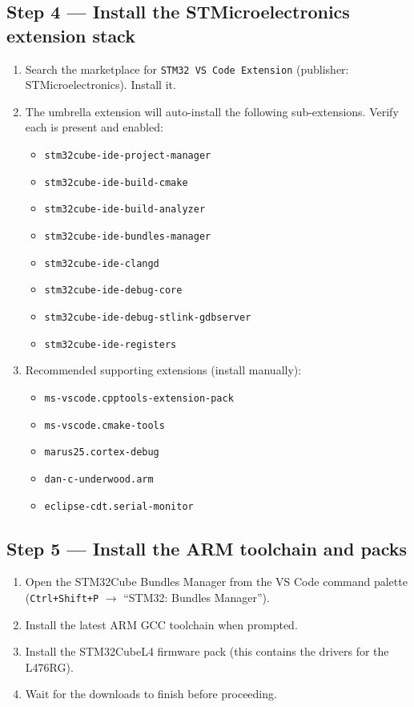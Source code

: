 \documentclass[11pt,letterpaper]{article}
\begin{document}
\newpage
\subsection{Step 4 --- Install the STMicroelectronics extension stack}
\begin{enumerate}[leftmargin=2em]
	\item Search the marketplace for \texttt{STM32 VS Code Extension} (publisher: STMicroelectronics). Install it.
	\item The umbrella extension will auto-install the following sub-extensions. Verify each is present and enabled:
	\begin{itemize}[leftmargin=1.2em, topsep=2pt, itemsep=1pt]
		\item \texttt{stm32cube-ide-project-manager}
		\item \texttt{stm32cube-ide-build-cmake}
		\item \texttt{stm32cube-ide-build-analyzer}
		\item \texttt{stm32cube-ide-bundles-manager}
		\item \texttt{stm32cube-ide-clangd}
		\item \texttt{stm32cube-ide-debug-core}
		\item \texttt{stm32cube-ide-debug-stlink-gdbserver}
		\item \texttt{stm32cube-ide-registers}
	\end{itemize}
	\item Recommended supporting extensions (install manually):
	\begin{itemize}[leftmargin=1.2em, topsep=2pt, itemsep=1pt]
		\item \texttt{ms-vscode.cpptools-extension-pack}
		\item \texttt{ms-vscode.cmake-tools}
		\item \texttt{marus25.cortex-debug}
		\item \texttt{dan-c-underwood.arm}
		\item \texttt{eclipse-cdt.serial-monitor}
	\end{itemize}
\end{enumerate}


\newpage
\subsection{Step 5 --- Install the ARM toolchain and \HAL{} packs}
\begin{enumerate}[leftmargin=2em]
	\item Open the STM32Cube Bundles Manager from the VS Code command palette (\texttt{Ctrl+Shift+P} $\to$ ``STM32: Bundles Manager'').
	\item Install the latest ARM GCC toolchain when prompted.
	\item Install the STM32Cube\mbox{L4} firmware pack (this contains the \HAL{} drivers for the L476RG).
	\item Wait for the downloads to finish before proceeding.
\end{enumerate}
\end{document}
